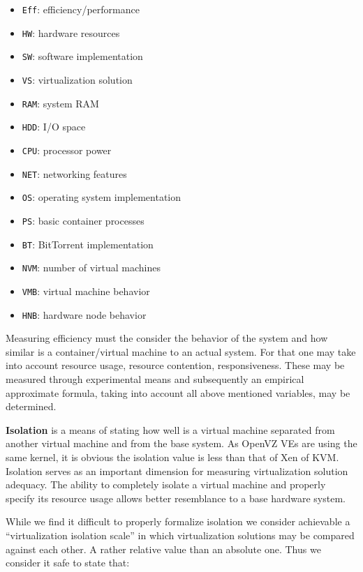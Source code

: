 \begin{multicols}{2}
    \begin{itemize}
      \item \texttt{Eff}: efficiency/performance
      \item \texttt{HW}: hardware resources
      \item \texttt{SW}: software implementation
      \item \texttt{VS}: virtualization solution
      \item \texttt{RAM}: system RAM
      \item \texttt{HDD}: I/O space
      \item \texttt{CPU}: processor power
      \item \texttt{NET}: networking features
      \item \texttt{OS}: operating system implementation
      \item \texttt{PS}: basic container processes
      \item \texttt{BT}: BitTorrent implementation
      \item \texttt{NVM}: number of virtual machines
      \item \texttt{VMB}: virtual machine behavior
      \item \texttt{HNB}: hardware node behavior
    \end{itemize}
\end{multicols}

Measuring efficiency must the consider the behavior of the system and how
similar is a container/virtual machine to an actual system. For that one may
take into account resource usage, resource contention, responsiveness. These
may be measured through experimental means and subsequently an empirical
approximate formula, taking into account all above mentioned variables, may be
determined.

\textbf{Isolation} is a means of stating how well is a virtual machine
separated from another virtual machine and from the base system. As OpenVZ VEs
are using the same kernel, it is obvious the isolation value is less than that
of Xen of KVM. Isolation serves as an important dimension for measuring
virtualization solution adequacy. The ability to completely isolate a virtual
machine and properly specify its resource usage allows better resemblance to a
base hardware system.

While we find it difficult to properly formalize isolation we consider
achievable a ``virtualization isolation scale'' in which virtualization
solutions may be compared against each other. A rather relative value than an
absolute one. Thus we consider it safe to state that:

